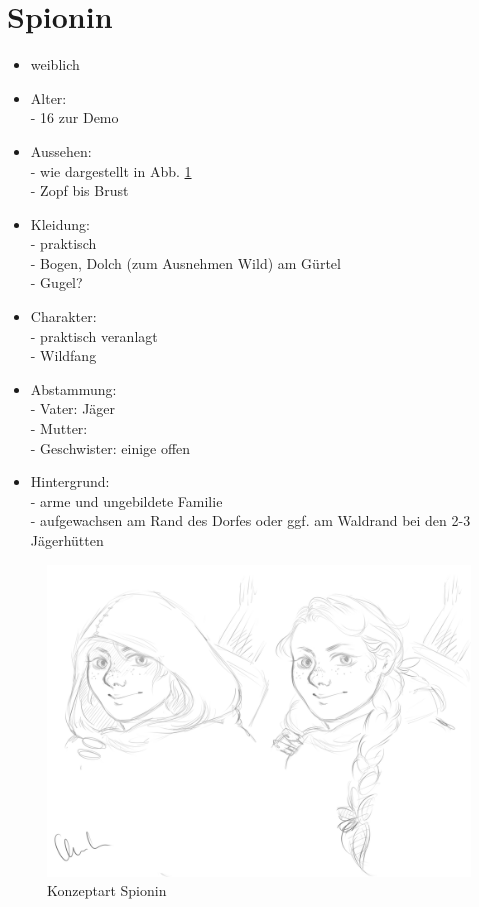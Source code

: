 \section{Spionin}
\begin{itemize}
	\item weiblich
	\item Alter:\\
	- 16 zur Demo
	\item Aussehen:\\
	- wie dargestellt in Abb. \ref{fig:spionin}\\
	- Zopf bis Brust
	\item Kleidung:\\
	- praktisch\\
	- Bogen, Dolch (zum Ausnehmen Wild) am Gürtel\\
	- Gugel?
	\item Charakter:\\
	- praktisch veranlagt\\
	- Wildfang
	\item Abstammung:\\
	- Vater: Jäger\\
	- Mutter: \\
	- Geschwister: einige offen
	\item Hintergrund:\\
	- arme und ungebildete Familie\\
	- aufgewachsen am Rand des Dorfes oder ggf. am Waldrand bei den 2-3 Jägerhütten
\end{itemize}

\begin{figure}
	\centering
	\includegraphics[width=0.7\linewidth]{Abbildungen/Abenteuer/Hauptcharaktere/spionin}
	\caption[Konzeptart Spionin]{Konzeptart Spionin}
	\label{fig:spionin}
\end{figure}
